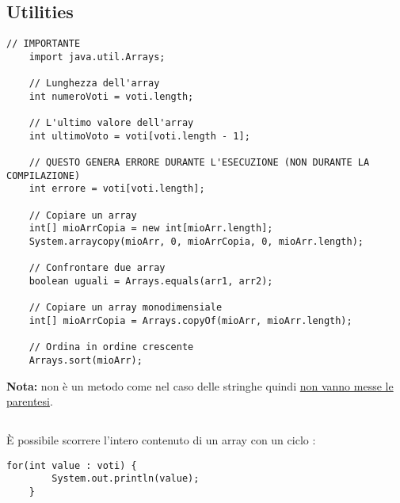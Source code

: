 \documentclass[../main.tex]{subfiles}
\begin{document}
\pagebreak
\subsection{Utilities}
\begin{lstlisting}[style=java]
    // IMPORTANTE
    import java.util.Arrays;

    // Lunghezza dell'array
    int numeroVoti = voti.length;

    // L'ultimo valore dell'array
    int ultimoVoto = voti[voti.length - 1];

    // QUESTO GENERA ERRORE DURANTE L'ESECUZIONE (NON DURANTE LA COMPILAZIONE)
    int errore = voti[voti.length];

    // Copiare un array
    int[] mioArrCopia = new int[mioArr.length];
    System.arraycopy(mioArr, 0, mioArrCopia, 0, mioArr.length);

    // Confrontare due array
    boolean uguali = Arrays.equals(arr1, arr2);

    // Copiare un array monodimensiale
    int[] mioArrCopia = Arrays.copyOf(mioArr, mioArr.length);

    // Ordina in ordine crescente
    Arrays.sort(mioArr);
\end{lstlisting}
\textbf{Nota:}  non è un metodo come nel caso delle stringhe quindi \underline{non vanno messe le parentesi}.

\vspace{0.5cm}
\subsection{}
È possibile scorrere l'intero contenuto di un array con un ciclo :
\begin{lstlisting}[style=java]
    for(int value : voti) {
        System.out.println(value);
    }
\end{lstlisting}
\end{document}
